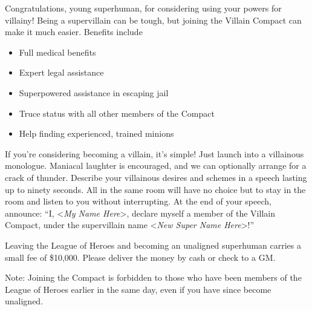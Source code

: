 \documentclass[white]{guildcamp1}
\begin{document}
\name{\wVillainRecruitment{}}

Congratulations, young superhuman, for considering using your powers for villainy!  Being a supervillain can be tough, but joining the Villain Compact can make it much easier.  Benefits include

\begin{itemize}
\item Full medical benefits
\item Expert legal assistance
\item Superpowered assistance in escaping jail
\item Truce status with all other members of the Compact
\item Help finding experienced, trained minions
\end{itemize}

If you're considering becoming a villain, it's simple!  Just launch into a villainous monologue.  Maniacal laughter is encouraged, and we can optionally arrange for a crack of thunder.  Describe your villainous desires and schemes in a speech lasting up to ninety seconds.  All in the same room will have no choice but to stay in the room and listen to you without interrupting.  At the end of your speech, announce: ``I, <\textit{My Name Here}>, declare myself a member of the Villain Compact, under the supervillain name <\textit{New Super Name Here}>!''

Leaving the League of Heroes and becoming an unaligned superhuman carries a small fee of \$10,000.  Please deliver the money by cash or check to a GM.

Note: Joining the Compact is forbidden to those who have been members of the League of Heroes earlier in the same day, even if you have since become unaligned.
\end{document}
